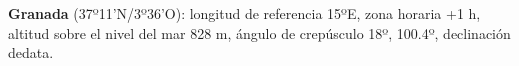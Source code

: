 \documentclass[12pt]{article}
\begin{document}
 \footnotesize \noindent \textbf{Granada} (37º11'N/3º36'O): longitud
 de referencia 15ºE, zona horaria +1 h, altitud sobre el nivel del mar
 828 m, \'angulo de crep\'usculo 18º, \arabfalse\transtrue {}
 100.4º, declinaci\'on dedata.


\end{document}
